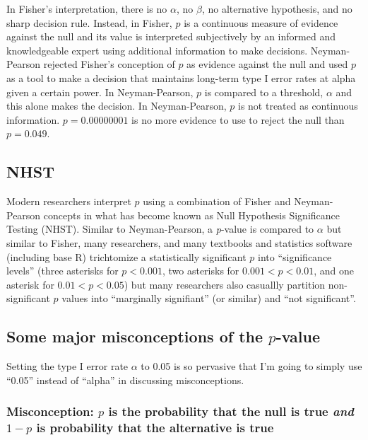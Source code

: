\documentclass[]{book}
\begin{document}
In Fisher's interpretation, there is no \(\alpha\), no \(\beta\), no alternative hypothesis, and no sharp decision rule. Instead, in Fisher, \(p\) is a continuous measure of evidence against the null and its value is interpreted subjectively by an informed and knowledgeable expert using additional information to make decisions. Neyman-Pearson rejected Fisher's conception of \(p\) as evidence against the null and used \(p\) as a tool to make a decision that maintains long-term type I error rates at alpha given a certain power. In Neyman-Pearson, \(p\) is compared to a threshold, \(\alpha\) and this alone makes the decision. In Neyman-Pearson, \(p\) is not treated as continuous information. \(p=0.00000001\) is no more evidence to use to reject the null than \(p=0.049\).

\hypertarget{nhst}{%
\subsection{NHST}\label{nhst}}

Modern researchers interpret \(p\) using a combination of Fisher and Neyman-Pearson concepts in what has become known as Null Hypothesis Significance Testing (NHST). Similar to Neyman-Pearson, a \emph{p}-value is compared to \(\alpha\) but similar to Fisher, many researchers, and many textbooks and statistics software (including base R) trichtomize a statistically significant \(p\) into ``significance levels'' (three asterisks for \(p < 0.001\), two asterisks for \(0.001 < p < 0.01\), and one asterisk for \(0.01 < p < 0.05\)) but many researchers also casuallly partition non-significant \(p\) values into ``marginally signifiant'' (or similar) and ``not significant''.

\hypertarget{some-major-misconceptions-of-the-p-value}{%
\subsection{\texorpdfstring{Some major misconceptions of the \(p\)-value}{Some major misconceptions of the p-value}}\label{some-major-misconceptions-of-the-p-value}}

Setting the type I error rate \(\alpha\) to 0.05 is so pervasive that I'm going to simply use ``0.05'' instead of ``alpha'' in discussing misconceptions.

\hypertarget{misconception-p-is-the-probability-that-the-null-is-true-and-1-p-is-probability-that-the-alternative-is-true}{%
\subsubsection{\texorpdfstring{Misconception: \(p\) is the probability that the null is true \emph{and} \(1-p\) is probability that the alternative is true}{Misconception: p is the probability that the null is true and 1-p is probability that the alternative is true}}\label{misconception-p-is-the-probability-that-the-null-is-true-and-1-p-is-probability-that-the-alternative-is-true}}
\end{document}

